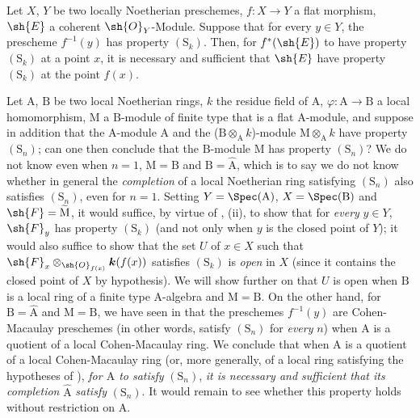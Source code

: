 \begin{corollary}[6.4.2]
\label{IV.6.4.2}
Let $X$, $Y$ be two locally Noetherian preschemes, $f:X\to Y$ a flat morphism, $\sh{E}$ a coherent $\sh{O}_Y$-Module.
Suppose that for every $y\in Y$, the prescheme $f^{-1}(y)$ has property $(\mathrm{S}_k)$.
Then, for $f^*(\sh{E})$ to have property $(\mathrm{S}_k)$ at a point $x$, it is necessary and sufficient that $\sh{E}$ have property $(\mathrm{S}_k)$ at the point $f(x)$.
\end{corollary}

\begin{remark}[6.4.3]
\label{IV.6.4.3}
Let $\mathrm{A}$, $\mathrm{B}$ be two local Noetherian rings, $k$ the residue field of $\mathrm{A}$, $\varphi:\mathrm{A}\to\mathrm{B}$ a local homomorphism, $\mathrm{M}$ a $\mathrm{B}$-module of finite type that is a flat $\mathrm{A}$-module, and suppose in addition that the $\mathrm{A}$-module $\mathrm{A}$ and the ($\mathrm{B}\otimes_\mathrm{A} k$)-module $\mathrm{M}\otimes_\mathrm{A} k$ have property $(\mathrm{S}_n)$; can one then conclude that the $\mathrm{B}$-module $\mathrm{M}$ has property $(\mathrm{S}_n)$?
We do not know even when $n=1$, $\mathrm{M}=\mathrm{B}$ and $\mathrm{B}=\hat{\mathrm{A}}$, which is to say we do not know whether in general the \emph{completion} of a local Noetherian ring satisfying $(\mathrm{S}_n)$ also satisfies $(\mathrm{S}_n)$, even for $n=1$.
Setting $Y=\Spec(\mathrm{A})$, $X=\Spec(\mathrm{B})$ and $\sh{F}=\widetilde{\mathrm{M}}$, it would suffice, by virtue of , (ii), to show that for \emph{every} $y\in Y$, $\sh{F}_y$ has property $(\mathrm{S}_k)$ (and not only when $y$ is the closed point of $Y$); it would also suffice to show that the set $U$ of $x\in X$ such that $\sh{F}_x\otimes_{\sh{O}_{f(x)}}\boldsymbol{k}(f(x))$ satisfies $(\mathrm{S}_k)$ is \emph{open} in $X$ (since it contains the closed point of $X$ by hypothesis).
We will show further on  that $U$ is open when $\mathrm{B}$ is a local ring of a finite type $\mathrm{A}$-algebra and $\mathrm{M}=\mathrm{B}$.
On the other hand, for $\mathrm{B}=\hat{\mathrm{A}}$ and $\mathrm{M}=\mathrm{B}$, we have seen in  that the preschemes $f^{-1}(y)$ are Cohen-Macaulay preschemes (in other words, satisfy $(\mathrm{S}_n)$ for \emph{every} $n$) when $\mathrm{A}$ is a quotient of a local Cohen-Macaulay ring.
We conclude that when $\mathrm{A}$ is a quotient of a local Cohen-Macaulay ring (or, more generally, of a local ring satisfying the hypotheses of ), \emph{for $\mathrm{A}$ to satisfy} $(\mathrm{S}_n)$, \emph{it is necessary and sufficient that its completion} $\hat{\mathrm{A}}$ \emph{satisfy} $(\mathrm{S}_n)$.
It would remain to see whether this property holds without restriction on $\mathrm{A}$.
\end{remark}

